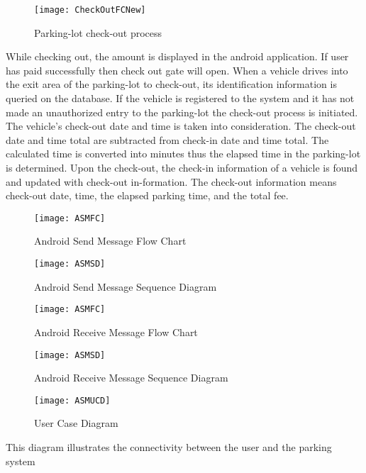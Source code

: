 \documentclass[12pt,a4paper]{report}
\begin{document}
\begin{figure}[H]
	\begin{center}
		\texttt{[image: CheckOutFCNew]}
		\caption{Parking-lot check-out process}
	\end{center}
\end{figure}
While checking out, the amount is displayed in the android application. If user has paid successfully then check out gate will open. When a vehicle drives into the exit area of the parking-lot to check-out, its identification information is queried on the database. If the vehicle is registered to the system and it has not made an unauthorized entry to the parking-lot the check-out process is initiated. The vehicle's check-out date and time is taken into consideration. The check-out date and time total are subtracted from check-in date and time total. The calculated time is converted into minutes thus the elapsed time in the parking-lot is determined. Upon the check-out, the check-in information of a vehicle is found and updated with check-out in-formation. The check-out information means check-out date, time, the elapsed parking time, and the total fee. 
\begin{figure}[H]
	\begin{center}
		\texttt{[image: ASMFC]}
		\caption{Android Send Message Flow Chart}
	\end{center}
\end{figure}
\begin{figure}[H]
	\begin{center}
	\texttt{[image: ASMSD]}
	\caption{Android Send Message Sequence Diagram}
\end{center}
\end{figure}
\begin{figure}[H]
	\begin{center}
		\texttt{[image: ASMFC]}
		\caption{Android Receive Message Flow Chart}
	\end{center}
\end{figure}
\begin{figure}[H]
	\begin{center}
		\texttt{[image: ASMSD]}
		\caption{Android Receive Message Sequence Diagram}
	\end{center}
\end{figure}
\begin{figure}[H]
	\begin{center}
		\texttt{[image: ASMUCD]}
		\caption{User Case Diagram}
	\end{center}
\end{figure}
This diagram illustrates the connectivity between the user and the parking system
\end{document}
